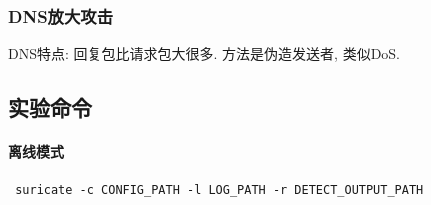 \documentclass{ctexart}
\begin{document}
\subsubsection{DNS放大攻击}
    DNS特点: 回复包比请求包大很多. 方法是伪造发送者, 类似DoS.
\subsection{实验命令}
\paragraph{离线模式}
\begin{verbatim} suricate -c CONFIG_PATH -l LOG_PATH -r DETECT_OUTPUT_PATH \end{verbatim}

\end{document}

